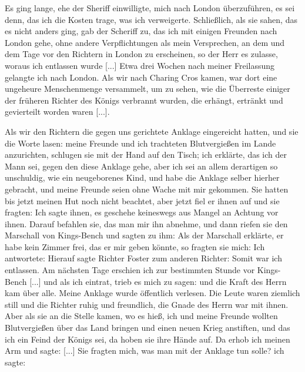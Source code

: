 Es ging lange, ehe der Sheriff einwilligte, mich nach London
überzuführen, es sei denn, das ich die Kosten trage, was ich 
verweigerte. Schließlich, als sie sahen, das es nicht anders ging,
gab der Scheriff zu, das ich mit einigen Freunden nach London
gehe, ohne andere Verpflichtungen als mein Versprechen, an
dem und dem Tage vor den Richtern in London zu erscheinen,
so der Herr es zulasse, woraus ich entlassen wurde [...]
Etwa drei Wochen nach meiner Freilassung gelangte ich nach
London. Als wir nach Charing Cros kamen, war dort eine
ungeheure Menschenmenge versammelt, um zu sehen, wie die
Überreste einiger der früheren Richter des Königs verbrannt
wurden, die erhängt, ertränkt und gevierteilt worden waren [...].

Als wir den Richtern die gegen uns gerichtete Anklage eingereicht 
hatten, und sie die Worte lasen: meine Freunde und ich
trachteten Blutvergießen im Lande anzurichten, schlugen sie mit
der Hand auf den Tisch; ich erklärte, das ich der Mann sei,
gegen den diese Anklage gehe, aber ich sei an allem derartigen
so unschuldig, wie ein neugeborenes Kind, und habe die Anklage
selber hierher gebracht, und meine Freunde seien ohne Wache mit
mir gekommen. Sie hatten bis jetzt meinen Hut noch nicht
beachtet, aber jetzt fiel er ihnen auf und sie fragten:  Ich sagte ihnen, es geschehe keineswegs
aus Mangel an Achtung vor ihnen. Darauf befahlen sie, das
man mir ihn abnehme, und dann riefen sie den Marschall von
Kings-Bench und sagten zu ihm:  Als der Marschall erklärte, er
habe kein Zimmer frei, das er mir geben könnte, so fragten sie
mich:  Ich antwortete:  Hierauf sagte Richter Foster zum anderen Richter:
 Somit war ich entlassen. Am nächsten Tage erschien
ich zur bestimmten Stunde vor Kings-Bench [...] und als ich
eintrat, trieb es mich zu sagen:  und die
Kraft des Herrn kam über alle. Meine Anklage wurde öffentlich
verlesen. Die Leute waren ziemlich still und die Richter ruhig
und freundlich, die Gnade des Herrn war mit ihnen. Aber als
sie an die Stelle kamen, wo es hieß, ich und meine Freunde
wollten Blutvergießen über das Land bringen und einen neuen
Krieg anstiften, und das ich ein Feind der Königs sei, da hoben
sie ihre Hände auf. Da erhob ich meinen Arm und sagte:  [...]
Sie fragten mich, was man mit der Anklage tun solle? ich sagte:

